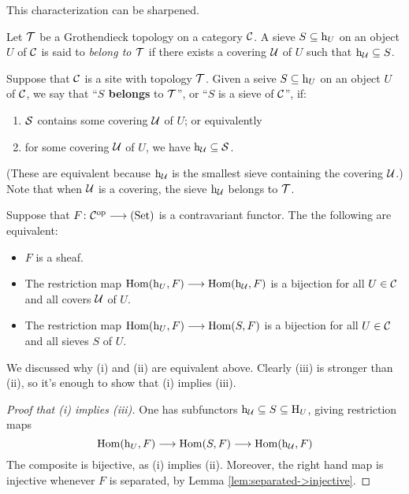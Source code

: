 \begin{2   CONTRAVARIANT FUNCTORS}
\begin{2.3 Sheaves in Grothendieck topologies}
This characterization can be sharpened.

\begin{definition}
Let $\mathcal{T}$ be a Grothendieck topology on a category $\mathcal{C}$. A sieve $S \subseteq \mathrm{h}_{U}$ on an object $U$ of $\mathcal{C}$ is said to \emph{belong to $\mathcal{T}$}%
 if there exists a covering $\mathcal{U}$ of $U$ such that $\mathrm{h}_{\mathcal{U}} \subseteq S$.
\end{definition}
\begin{shaded}
Suppose that $\mathcal{C}$ is a site with topology $\mathcal{T}$.
Given a seive $S\subseteq \mathrm{h}_U$ on an object $U$ of $\mathcal{C}$, we say that ``\textbf{$S$ belongs} to $\mathcal{T}$'', or ``$S$ is a sieve of $\mathcal{C}$'', if:
\begin{enumerate}\squishlist
\item  $\mathcal{S}$ contains some covering $\mathcal{U}$ of $U$; or equivalently
\item for some covering $\mathcal{U}$ of $U$, we have $\mathrm{h}_{\mathcal{U}}\subseteq \mathcal{S}$.
\end{enumerate}
{\small(These are equivalent because $\mathrm{h}_{\mathcal{U}}$ is the smallest sieve containing the covering $\mathcal{U}$.)} Note that when $\mathcal{U}$ is a covering, the sieve $\mathrm{h}_{\mathcal{U}}$ belongs to $\mathcal{T}$. %

Suppose that $F \colon \cC\op \arr \catset$ is a contravariant functor. The the following are equivalent:
\begin{itemize}\squishlist
\item[(i)] $F$ is a sheaf.
\item[(ii)] The restriction map $\operatorname{Hom}(\mathrm{h}_{U}, F)\longrightarrow\operatorname{Hom}(\mathrm{h}_{\mathcal{U}}, F)$ is a bijection for all $U\in \mathcal{C}$ and all covers $\mathcal{U}$ of $U$.
\item[(iii)] The restriction map $\operatorname{Hom}(\mathrm{h}_{U}, F)\longrightarrow\operatorname{Hom}(S, F)$ is a bijection for all $U\in \mathcal{C}$ and all sieves $S$ of $U$.
\end{itemize}
We discussed why (i) and (ii) are equivalent above. Clearly (iii) is stronger than (ii), so it's enough to show that (i) implies (iii).
\begin{proof}[Proof that ({\rm i}) implies ({\rm iii})]
One has subfunctors $\mathrm{h}_{\mathcal{U}}\subseteq S\subseteq \operatorname{H}_U$, giving restriction maps
   \[
   \hom(\h_{U}, F) \arr \hom(S, F) \arr \hom(\h_{\cU}, F)
   \]
The composite is bijective, as (i) implies (ii). Moreover, the right hand map is injective whenever $F$ is separated, by Lemma \ref{lem:separated->injective}.
\end{proof}


\end{shaded}
\end{2.3 Sheaves in Grothendieck topologies}
\end{2   CONTRAVARIANT FUNCTORS}

